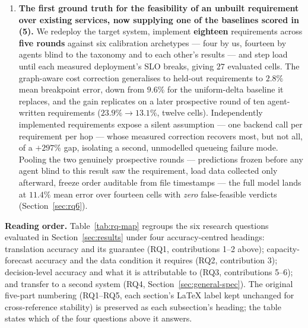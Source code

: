 \documentclass[journal, 10pt]{IEEEtran}
\begin{document}
\begin{enumerate}
    \item \textbf{The first ground truth for the feasibility of an unbuilt requirement over existing services, now supplying one of the baselines scored in (5).} We redeploy the target system, implement \textbf{eighteen} requirements across \textbf{five rounds} against six calibration archetypes --- four by us, fourteen by agents blind to the taxonomy and to each other's results --- and step load until each measured deployment's SLO breaks, giving $27$ evaluated cells. The graph-aware cost correction generalises to held-out requirements to $2.8\%$ mean breakpoint error, down from $9.6\%$ for the uniform-delta baseline it replaces, and the gain replicates on a later prospective round of ten agent-written requirements ($23.9\%\to13.1\%$, twelve cells). Independently implemented requirements expose a silent assumption --- one backend call per requirement per hop --- whose measured correction recovers most, but not all, of a $+297\%$ gap, isolating a second, unmodelled queueing failure mode. Pooling the two genuinely prospective rounds --- predictions frozen before any agent blind to this result saw the requirement, load data collected only afterward, freeze order auditable from file timestamps --- the full model lands at $11.4\%$ mean error over fourteen cells with \emph{zero} false-feasible verdicts (Section~\ref{sec:rq6}).
\end{enumerate}

\textbf{Reading order.} Table~\ref{tab:rq-map} regroups the six research
questions evaluated in Section~\ref{sec:results} under four accuracy-centred
headings: translation accuracy and its guarantee (RQ1, contributions 1--2
above); capacity-forecast accuracy and the data condition it requires (RQ2,
contribution 3); decision-level accuracy and what it is attributable to (RQ3,
contributions 5--6); and transfer to a second system (RQ4,
Section~\ref{sec:general-spec}). The original five-part numbering
(RQ1--RQ5, each section's \LaTeX{} label kept unchanged for cross-reference
stability) is preserved as each subsection's heading; the table states which
of the four questions above it answers.
\end{document}
